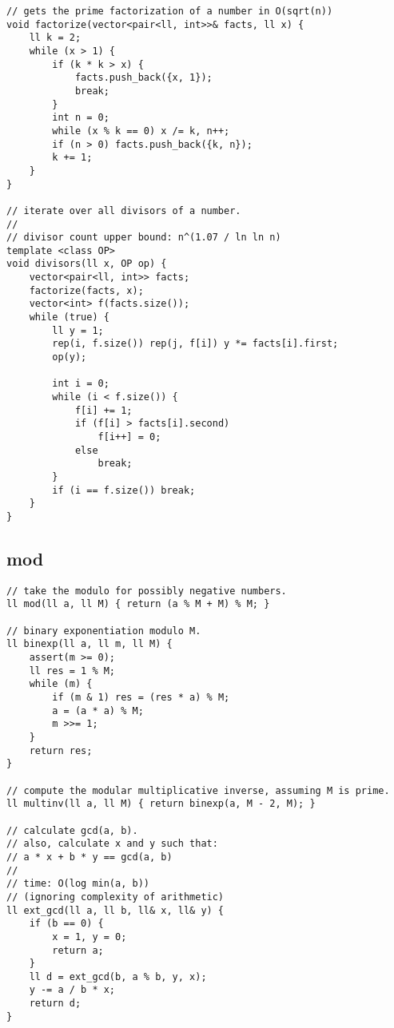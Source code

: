 \documentclass[twoside]{article}
\begin{document}
\begin{multicols*}{2}
\begin{verbatim}
// gets the prime factorization of a number in O(sqrt(n))
void factorize(vector<pair<ll, int>>& facts, ll x) {
    ll k = 2;
    while (x > 1) {
        if (k * k > x) {
            facts.push_back({x, 1});
            break;
        }
        int n = 0;
        while (x % k == 0) x /= k, n++;
        if (n > 0) facts.push_back({k, n});
        k += 1;
    }
}

// iterate over all divisors of a number.
//
// divisor count upper bound: n^(1.07 / ln ln n)
template <class OP>
void divisors(ll x, OP op) {
    vector<pair<ll, int>> facts;
    factorize(facts, x);
    vector<int> f(facts.size());
    while (true) {
        ll y = 1;
        rep(i, f.size()) rep(j, f[i]) y *= facts[i].first;
        op(y);

        int i = 0;
        while (i < f.size()) {
            f[i] += 1;
            if (f[i] > facts[i].second)
                f[i++] = 0;
            else
                break;
        }
        if (i == f.size()) break;
    }
}
\end{verbatim}

{
\subsection*{mod}
}
\begin{verbatim}
// take the modulo for possibly negative numbers.
ll mod(ll a, ll M) { return (a % M + M) % M; }

// binary exponentiation modulo M.
ll binexp(ll a, ll m, ll M) {
    assert(m >= 0);
    ll res = 1 % M;
    while (m) {
        if (m & 1) res = (res * a) % M;
        a = (a * a) % M;
        m >>= 1;
    }
    return res;
}

// compute the modular multiplicative inverse, assuming M is prime.
ll multinv(ll a, ll M) { return binexp(a, M - 2, M); }

// calculate gcd(a, b).
// also, calculate x and y such that:
// a * x + b * y == gcd(a, b)
//
// time: O(log min(a, b))
// (ignoring complexity of arithmetic)
ll ext_gcd(ll a, ll b, ll& x, ll& y) {
    if (b == 0) {
        x = 1, y = 0;
        return a;
    }
    ll d = ext_gcd(b, a % b, y, x);
    y -= a / b * x;
    return d;
}


\end{verbatim}
\end{multicols*}
\end{document}
